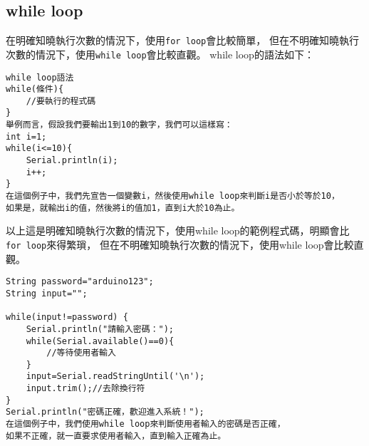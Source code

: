 \documentclass[12pt,a4paper]{article}
\begin{document}
\subsection{while loop}
在明確知曉執行次數的情況下，使用\texttt{for loop}會比較簡單，
但在不明確知曉執行次數的情況下，使用\texttt{while loop}會比較直觀。
while loop的語法如下：
\begin{lstlisting}
while loop語法
while(條件){
    //要執行的程式碼
}
舉例而言，假設我們要輸出1到10的數字，我們可以這樣寫：
int i=1;
while(i<=10){
    Serial.println(i);
    i++;
}
在這個例子中，我們先宣告一個變數i，然後使用while loop來判斷i是否小於等於10，
如果是，就輸出i的值，然後將i的值加1，直到i大於10為止。
\end{lstlisting}
以上這是明確知曉執行次數的情況下，使用while loop的範例程式碼，明顯會比\texttt{for loop}來得繁瑣，
但在不明確知曉執行次數的情況下，使用while loop會比較直觀。
\begin{lstlisting}
String password="arduino123";
String input="";

while(input!=password) {
    Serial.println("請輸入密碼：");
    while(Serial.available()==0){
        //等待使用者輸入
    }
    input=Serial.readStringUntil('\n');
    input.trim();//去除換行符
}
Serial.println("密碼正確，歡迎進入系統！");
在這個例子中，我們使用while loop來判斷使用者輸入的密碼是否正確，
如果不正確，就一直要求使用者輸入，直到輸入正確為止。
\end{lstlisting}
\end{document}
